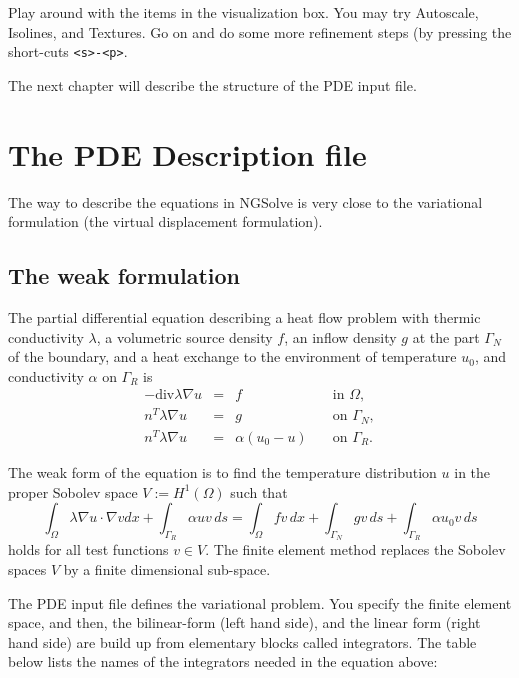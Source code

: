 \documentclass[12pt]{book}
\begin{document}
Play around with the items in the visualization box. You may try Autoscale, Isolines, and Textures. Go on and do some more refinement steps (by pressing the short-cuts {\tt <s>-<p>}.


The next chapter will describe the structure of the PDE input file.


\chapter{The PDE Description file}

The way to describe the equations in NGSolve is very close to
the variational formulation (the virtual displacement formulation).

\section{The weak formulation}

The partial differential equation describing a heat flow problem
with thermic conductivity $\lambda$, a volumetric source density $f$, 
an inflow density $g$ at the part $\Gamma_N$ of the boundary, 
and a heat exchange to the environment of temperature $u_0$, and 
conductivity $\alpha$ on $\Gamma_R$ is
\begin{displaymath}
\begin{array}{rcll}
-\mbox {div} \lambda \nabla u & = & f \quad & \mbox{in } \Omega, \\
n^T \lambda \nabla u & = & g  \quad & \mbox{on } \Gamma_N, \\
n^T \lambda \nabla u & = & \alpha (u_0 - u)  \quad & \mbox{on } \Gamma_R.
\end{array}
\end{displaymath}

 
The weak form of the equation is to find the temperature distribution $u$
in the proper Sobolev space $V := H^1(\Omega)$ such that
$$
\int_\Omega \lambda \nabla u \cdot \nabla v dx + \int_{\Gamma_R} \alpha u v \, ds =
\int_\Omega f v \, dx + \int_{\Gamma_N} g v \, ds + \int_{\Gamma_R} \alpha u_0 v \, ds
$$
holds for all test functions $v \in V$. The finite element method replaces the
Sobolev spaces $V$ by a finite dimensional sub-space.

The PDE input file defines the variational problem. You specify the
finite element space, and then, the bilinear-form (left hand side),
and the linear form (right hand side) are build up from elementary
blocks called integrators. The table below lists the names of the
integrators needed in the equation above:
\end{document}

